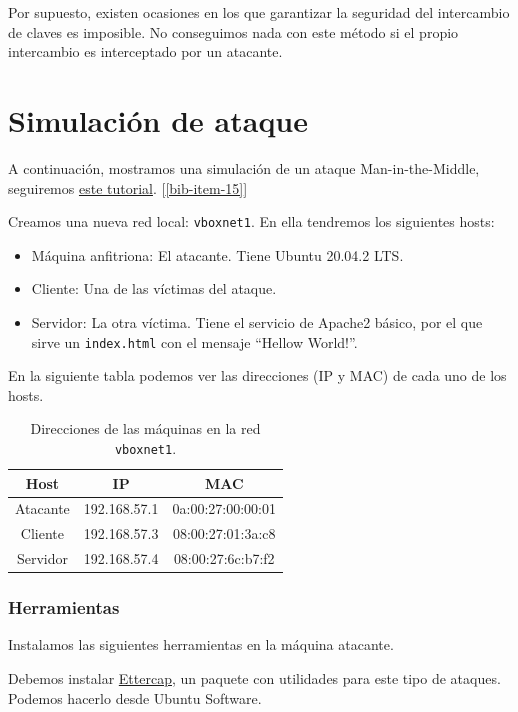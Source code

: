 \documentclass[11pt]{article}
\begin{document}
Por supuesto, existen ocasiones en los que garantizar la seguridad del intercambio de claves es imposible. No conseguimos nada con este método si el
propio intercambio es interceptado por un atacante.

\section{Simulación de ataque}

A continuación, mostramos una simulación de un ataque Man-in-the-Middle, seguiremos
\href{https://www.youtube.com/watch?v=fbXu8EX0hsI}{este tutorial}. [\ref{bib-item-15}]

Creamos una nueva red local: \texttt{vboxnet1}. En ella tendremos los siguientes hosts:
\begin{itemize}
	\item Máquina anfitriona: El atacante. Tiene Ubuntu 20.04.2 LTS.
	\item Cliente: Una de las víctimas del ataque.
	\item Servidor: La otra víctima. Tiene el servicio de Apache2 básico, por el que sirve un \texttt{index.html} con el mensaje
	``Hellow World!''.
\end{itemize}

En la siguiente tabla podemos ver las direcciones (IP y MAC) de cada uno de los hosts.

\begin{table}[H]
	\centering
	\begin{tabular}{|c|c|c|}
		\hline
		\textbf{Host} & \textbf{IP}  & \textbf{MAC}      \\ \hline
		Atacante      & 192.168.57.1 & 0a:00:27:00:00:01 \\ \hline
		Cliente       & 192.168.57.3 & 08:00:27:01:3a:c8 \\ \hline
		Servidor      & 192.168.57.4 & 08:00:27:6c:b7:f2 \\ \hline
	\end{tabular}
	\caption{Direcciones de las máquinas en la red \texttt{vboxnet1}.}
	\label{tab:info-hosts}
\end{table}

\subsubsection*{Herramientas}

Instalamos las siguientes herramientas en la máquina atacante.

Debemos instalar \href{https://www.ettercap-project.org}{Ettercap}, un paquete con utilidades para este tipo de ataques.
Podemos hacerlo desde Ubuntu Software.
\end{document}
